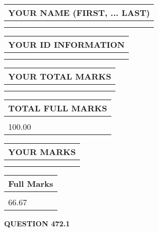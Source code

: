 \documentclass{ctexart}
\begin{document}
   
   
   
\newpage 
\setcounter{page}{ 
   472001 } 
   
   
   
   
\noindent\begin{tabular}{|l|}
\hline
YOUR NAME (FIRST, ... LAST)  \\
\hline
 \\ 
 \\ 
\hline
\end{tabular}
\hspace{0.05in} \begin{tabular}{|l|}
\hline
 YOUR   ID   INFORMATION  \\
\hline
 \\ 
 \\ 
\hline
\end{tabular}
   
   
\vspace{0.2in}\noindent\begin{tabular}{|l|}
\hline
YOUR TOTAL MARKS  \\
\hline
 \\ 
 \\ 
\hline
\end{tabular}
\hspace{0.05in} \begin{tabular}{|l|}
\hline
TOTAL FULL MARKS  \\
\hline
 \\ 
100.00 \\
\hline
\end{tabular}
   
   
 \vspace{0.2in}
 
 
 
 
   
   
  
\vspace{0.2in}
  
\noindent\begin{tabular}{|l|}
\hline
 YOUR MARKS  \\
\hline
 \\ 
 \\ 
\hline
\end{tabular}
\hspace{0.05in} \begin{tabular}{|l|}
\hline
 Full Marks  \\
\hline
 \\ 
66.67 \\
\hline
\end{tabular}
{\textbf{\Large{QUESTION
472.1 
}}}
  
\end{document}
